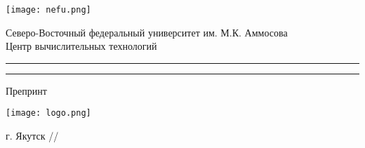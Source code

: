\begin{titlepage}
		\begin{center}
			\begin{footnotesize}
				\texttt{[image: nefu.png]}
			
				\vspace{3mm}			

				Северо-Восточный федеральный университет им. М.К. Аммосова \\
				Центр вычислительных технологий
			\end{footnotesize}
		\end{center}		

	
	\vfill
	
	\begin{center}
		\rule{\linewidth}{0.3mm}\vspace{10mm}

		\begin{LARGE}
			\thetitle
		\end{LARGE}
		
		\vspace{5mm}\rule{\linewidth}{0.3mm}
			
		\vspace{10mm}

		\theauthor
	\end{center}

	\vfill
	
	\begin{center}
		\begin{footnotesize}
			Препринт \thepreprint
			
			\vspace{3mm}			

			\texttt{[image: logo.png]}
			
			г. Якутск // \the\year
		\end{footnotesize}
	\end{center}
\end{titlepage}
